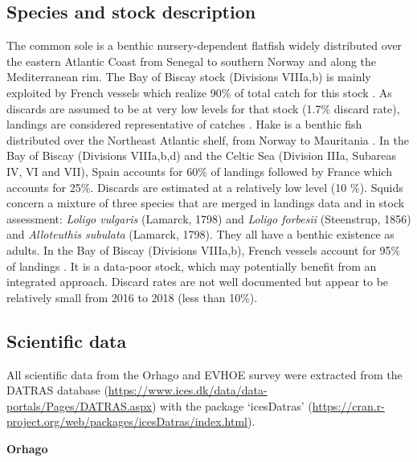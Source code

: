 \clearpage

\subsection{Species and stock description}\label{appendix:SppDescr}

The common sole is a benthic nursery-dependent flatfish widely distributed over the eastern Atlantic Coast from Senegal to southern Norway and along the Mediterranean rim. The Bay of Biscay stock (Divisions VIIIa,b) is mainly exploited by French vessels which realize 90\% of total catch for this stock \parencite{ices-sole-2019}. As discards are assumed to be at very low levels for that stock (1.7\% discard rate), landings are considered representative of catches \parencite{ices-sole-2018}.
Hake is a benthic fish distributed over the Northeast Atlantic shelf, from Norway to Mauritania \parencite{ices-report-2013,ices-working-2020}. In the Bay of Biscay (Divisions VIIIa,b,d) and the Celtic Sea (Division IIIa, Subareas IV, VI and VII), Spain accounts for 60\% of landings followed by France which accounts for 25\%. Discards are estimated at a relatively low level (10 \%). 
Squids concern a mixture of three species that are merged in landings data and in stock assessment: \textit{Loligo vulgaris} (Lamarck, 1798) and \textit{Loligo forbesii} (Steenstrup, 1856) and \textit{Alloteuthis subulata} (Lamarck, 1798). They all have a benthic existence as adults. In the Bay of Biscay (Divisions VIIIa,b), French vessels account for 95\% of landings \parencite{icesWorkingGroupCephalopod2020}. It is a data-poor stock, which may potentially benefit from an integrated approach. Discard rates are not well documented but appear to be relatively small from 2016 to 2018 (less than 10\%).

\clearpage

\subsection{Scientific data}\label{appendix:SciData}

All scientific data from the Orhago and EVHOE survey were extracted from the DATRAS database (\url{https://www.ices.dk/data/data-portals/Pages/DATRAS.aspx}) with the package ‘icesDatras’ (\url{https://cran.r-project.org/web/packages/icesDatras/index.html}).

\vspace{\baselineskip}

\textbf{Orhago}

